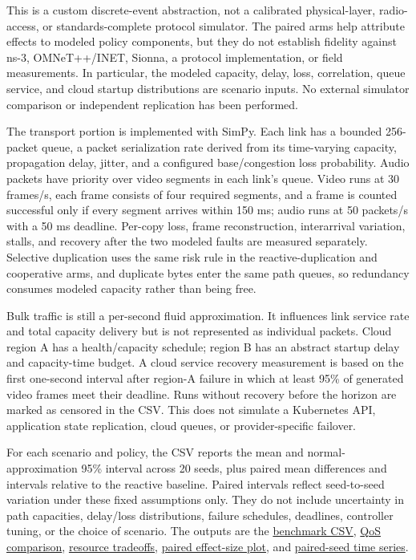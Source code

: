 \documentclass[
  american,
  11pt,
]{article}
\begin{document}
This is a custom discrete-event abstraction, not a calibrated
physical-layer, radio-access, or standards-complete protocol simulator.
The paired arms help attribute effects to modeled policy components, but
they do not establish fidelity against ns-3, OMNeT++/INET, Sionna, a
protocol implementation, or field measurements. In particular, the
modeled capacity, delay, loss, correlation, queue service, and cloud
startup distributions are scenario inputs. No external simulator
comparison or independent replication has been performed.

The transport portion is implemented with SimPy. Each link has a bounded
256-packet queue, a packet serialization rate derived from its
time-varying capacity, propagation delay, jitter, and a configured
base/congestion loss probability. Audio packets have priority over video
segments in each link's queue. Video runs at 30 frames/s, each frame
consists of four required segments, and a frame is counted successful
only if every segment arrives within 150 ms; audio runs at 50 packets/s
with a 50 ms deadline. Per-copy loss, frame reconstruction, interarrival
variation, stalls, and recovery after the two modeled faults are
measured separately. Selective duplication uses the same risk rule in
the reactive-duplication and cooperative arms, and duplicate bytes enter
the same path queues, so redundancy consumes modeled capacity rather
than being free.

Bulk traffic is still a per-second fluid approximation. It influences
link service rate and total capacity delivery but is not represented as
individual packets. Cloud region A has a health/capacity schedule;
region B has an abstract startup delay and capacity-time budget. A cloud
service recovery measurement is based on the first one-second interval
after region-A failure in which at least 95\% of generated video frames
meet their deadline. Runs without recovery before the horizon are marked
as censored in the CSV. This does not simulate a Kubernetes API,
application state replication, cloud queues, or provider-specific
failover.

For each scenario and policy, the CSV reports the mean and
normal-approximation 95\% interval across 20 seeds, plus paired mean
differences and intervals relative to the reactive baseline. Paired
intervals reflect seed-to-seed variation under these fixed assumptions
only. They do not include uncertainty in path capacities, delay/loss
distributions, failure schedules, deadlines, controller tuning, or the
choice of scenario. The outputs are the
\href{../figures/brain_inspired_cooperative_benchmark.csv}{benchmark
CSV}, \href{../figures/brain_inspired_cooperative_benchmark.png}{QoS
comparison},
\href{../figures/brain_inspired_cooperative_resources.png}{resource
tradeoffs},
\href{../figures/brain_inspired_cooperative_effects.png}{paired
effect-size plot}, and
\href{../figures/brain_inspired_cooperative_timeseries.png}{paired-seed
time series}.
\end{document}
